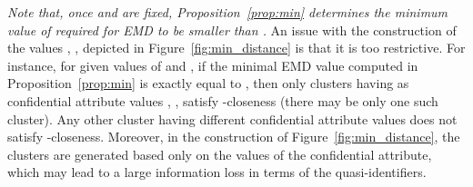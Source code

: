 \documentclass[10pt,journal,compsoc]{IEEEtran}
\theoremstyle{definition}
\theoremstyle{plain}
\begin{document}
{\em Note that, once  and  are fixed, Proposition~\ref{prop:min} 
determines the minimum value of  required
for EMD to be smaller than .} An issue with the construction of 
the  values , ,  
depicted in Figure~\ref{fig:min_distance}
is that it is too restrictive. For instance, for given values of 
and , if the minimal EMD value computed in Proposition~\ref{prop:min}
is exactly equal to , 
then only clusters having as confidential attribute values 
, ,  satisfy -closeness (there may be 
only one such cluster).  
Any other cluster having different confidential attribute
values does not satisfy -closeness. 
Moreover, in the construction of Figure~\ref{fig:min_distance},
the clusters are generated based only on the values of the confidential
attribute, which may lead to a large information loss in
terms of the quasi-identifiers. 
\end{document}
